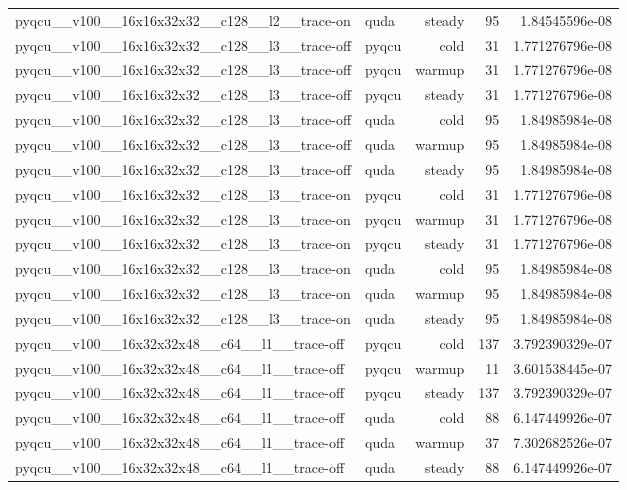 \begin{table}[htbp]
\begin{tabular}{@{}llrrr@{}}
pyqcu\_\_v100\_\_16x16x32x32\_\_c128\_\_l2\_\_trace-on & quda & steady & 95 & 1.84545596e-08 \\
pyqcu\_\_v100\_\_16x16x32x32\_\_c128\_\_l3\_\_trace-off & pyqcu & cold & 31 & 1.771276796e-08 \\
pyqcu\_\_v100\_\_16x16x32x32\_\_c128\_\_l3\_\_trace-off & pyqcu & warmup & 31 & 1.771276796e-08 \\
pyqcu\_\_v100\_\_16x16x32x32\_\_c128\_\_l3\_\_trace-off & pyqcu & steady & 31 & 1.771276796e-08 \\
pyqcu\_\_v100\_\_16x16x32x32\_\_c128\_\_l3\_\_trace-off & quda & cold & 95 & 1.84985984e-08 \\
pyqcu\_\_v100\_\_16x16x32x32\_\_c128\_\_l3\_\_trace-off & quda & warmup & 95 & 1.84985984e-08 \\
pyqcu\_\_v100\_\_16x16x32x32\_\_c128\_\_l3\_\_trace-off & quda & steady & 95 & 1.84985984e-08 \\
pyqcu\_\_v100\_\_16x16x32x32\_\_c128\_\_l3\_\_trace-on & pyqcu & cold & 31 & 1.771276796e-08 \\
pyqcu\_\_v100\_\_16x16x32x32\_\_c128\_\_l3\_\_trace-on & pyqcu & warmup & 31 & 1.771276796e-08 \\
pyqcu\_\_v100\_\_16x16x32x32\_\_c128\_\_l3\_\_trace-on & pyqcu & steady & 31 & 1.771276796e-08 \\
pyqcu\_\_v100\_\_16x16x32x32\_\_c128\_\_l3\_\_trace-on & quda & cold & 95 & 1.84985984e-08 \\
pyqcu\_\_v100\_\_16x16x32x32\_\_c128\_\_l3\_\_trace-on & quda & warmup & 95 & 1.84985984e-08 \\
pyqcu\_\_v100\_\_16x16x32x32\_\_c128\_\_l3\_\_trace-on & quda & steady & 95 & 1.84985984e-08 \\
pyqcu\_\_v100\_\_16x32x32x48\_\_c64\_\_l1\_\_trace-off & pyqcu & cold & 137 & 3.792390329e-07 \\
pyqcu\_\_v100\_\_16x32x32x48\_\_c64\_\_l1\_\_trace-off & pyqcu & warmup & 11 & 3.601538445e-07 \\
pyqcu\_\_v100\_\_16x32x32x48\_\_c64\_\_l1\_\_trace-off & pyqcu & steady & 137 & 3.792390329e-07 \\
pyqcu\_\_v100\_\_16x32x32x48\_\_c64\_\_l1\_\_trace-off & quda & cold & 88 & 6.147449926e-07 \\
pyqcu\_\_v100\_\_16x32x32x48\_\_c64\_\_l1\_\_trace-off & quda & warmup & 37 & 7.302682526e-07 \\
pyqcu\_\_v100\_\_16x32x32x48\_\_c64\_\_l1\_\_trace-off & quda & steady & 88 & 6.147449926e-07 \\

\end{tabular}
\end{table}
